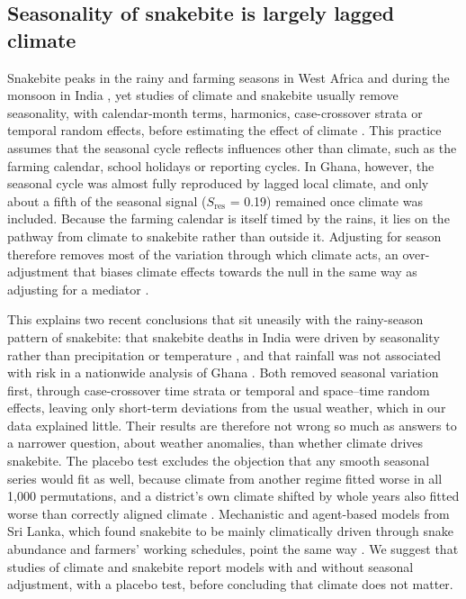 \documentclass[11pt,a4paper]{article}
\begin{document}
\subsection{Seasonality of snakebite is largely lagged climate}

Snakebite peaks in the rainy and farming seasons in West Africa \cite{ref4,ref6,ref57,ref58} and during the monsoon in India \cite{ref59}, yet studies of climate and snakebite usually remove seasonality, with calendar-month terms, harmonics, case-crossover strata or temporal random effects, before estimating the effect of climate \cite{ref8,ref30}. This practice assumes that the seasonal cycle reflects influences other than climate, such as the farming calendar, school holidays or reporting cycles. In Ghana, however, the seasonal cycle was almost fully reproduced by lagged local climate, and only about a fifth of the seasonal signal (\(S_{\text{res}}\) = 0.19) remained once climate was included. Because the farming calendar is itself timed by the rains, it lies on the pathway from climate to snakebite rather than outside it. Adjusting for season therefore removes most of the variation through which climate acts, an over-adjustment that biases climate effects towards the null in the same way as adjusting for a mediator \cite{ref40}.

This explains two recent conclusions that sit uneasily with the rainy-season pattern of snakebite: that snakebite deaths in India were driven by seasonality rather than precipitation or temperature \cite{ref12}, and that rainfall was not associated with risk in a nationwide analysis of Ghana \cite{ref13}. Both removed seasonal variation first, through case-crossover time strata or temporal and space--time random effects, leaving only short-term deviations from the usual weather, which in our data explained little. Their results are therefore not wrong so much as answers to a narrower question, about weather anomalies, than whether climate drives snakebite. The placebo test excludes the objection that any smooth seasonal series would fit as well, because climate from another regime fitted worse in all 1,000 permutations, and a district's own climate shifted by whole years also fitted worse than correctly aligned climate \cite{ref39}. Mechanistic and agent-based models from Sri Lanka, which found snakebite to be mainly climatically driven through snake abundance and farmers' working schedules, point the same way \cite{ref60,ref61}. We suggest that studies of climate and snakebite report models with and without seasonal adjustment, with a placebo test, before concluding that climate does not matter.
\end{document}
